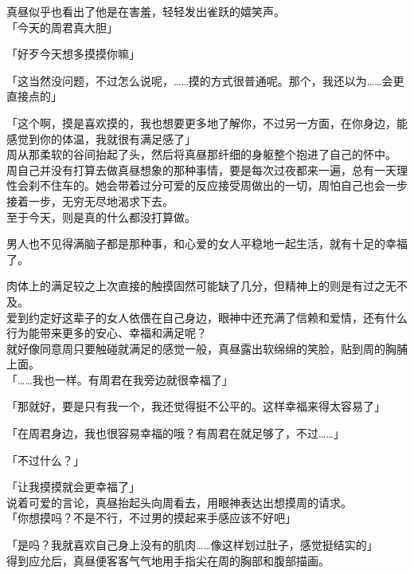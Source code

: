 真昼似乎也看出了他是在害羞，轻轻发出雀跃的嬉笑声。\\

「今天的周君真大胆」

「好歹今天想多摸摸你嘛」

「这当然没问题，不过怎么说呢，……摸的方式很普通呢。那个，我还以为……会更直接点的」

「这个啊，摸是喜欢摸的，我也想要更多地了解你，不过另一方面，在你身边，能感觉到你的体温，我就很有满足感了」\\

周从那柔软的谷间抬起了头，然后将真昼那纤细的身躯整个抱进了自己的怀中。\\

周自己并没有打算去做真昼想象的那种事情，要是每次过夜都来一遍，总有一天理性会刹不住车的。她会带着过分可爱的反应接受周做出的一切，周怕自己也会一步接着一步，无穷无尽地渴求下去。\\

至于今天，则是真的什么都没打算做。

男人也不见得满脑子都是那种事，和心爱的女人平稳地一起生活，就有十足的幸福了。

肉体上的满足较之上次直接的触摸固然可能缺了几分，但精神上的则是有过之无不及。\\

爱到约定好这辈子的女人依偎在自己身边，眼神中还充满了信赖和爱情，还有什么行为能带来更多的安心、幸福和满足呢？\\

就好像同意周只要触碰就满足的感觉一般，真昼露出软绵绵的笑脸，贴到周的胸脯上面。\\

「……我也一样。有周君在我旁边就很幸福了」

「那就好，要是只有我一个，我还觉得挺不公平的。这样幸福来得太容易了」

「在周君身边，我也很容易幸福的哦？有周君在就足够了，不过……」

「不过什么？」

「让我摸摸就会更幸福了」\\

说着可爱的言论，真昼抬起头向周看去，用眼神表达出想摸周的请求。\\

「你想摸吗？不是不行，不过男的摸起来手感应该不好吧」

「是吗？我就喜欢自己身上没有的肌肉……像这样划过肚子，感觉挺结实的」\\

得到应允后，真昼便客客气气地用手指尖在周的胸部和腹部描画。

